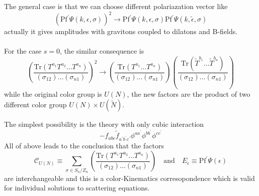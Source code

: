 \documentclass{beamer}
\begin{document}
\begin{frame}
    The general case is that we can choose different polariazation vector like 
    \begin{equation*}
        \left(\mathrm{Pf}^\prime \Psi(k,\epsilon,\sigma)\right)^2\to\mathrm{Pf}^\prime \Psi(k,\epsilon,\sigma)\mathrm{Pf}^\prime \Psi(k,\tilde{\epsilon},\sigma)
    \end{equation*}
    actually it gives amplitudes with gravitons coupled to dilatons and B-fields.
    \\ \hspace*{\fill}\\
    For the case $s=0$, the similar consequence is 
    \begin{equation*}
        \left(\frac{\mathrm{Tr}(T^{a_1}T^{a_2}\dots T^{a_n})}{(\sigma_{12})\dots (\sigma_{n1})}\right)^2\to\left(\frac{\mathrm{Tr}(T^{a_1}\dots T^{a_n})}{(\sigma_{12})\dots (\sigma_{n1})}\right)
        \left(\frac{\mathrm{Tr}(\tilde{T}^{b_1}\dots \tilde{T}^{b_n})}{(\sigma_{12})\dots (\sigma_{n1})}\right)
    \end{equation*}
    while the original color group is $U(N)$, the new factors are the product of two different color group \alert{$U(N)\times U(\tilde{N})$}.
\end{frame}
\begin{frame}
    The simplest possibility is the theory with only cubic interaction
    \begin{equation*}
        -f_{abc}\tilde{f}_{a^\prime b^\prime c^\prime}\phi^{aa^\prime}\phi^{bb^\prime}\phi^{cc^\prime}
    \end{equation*}
    All of above leads to the conclusion that the factors 
    \begin{equation*}
        \mathcal{C}_{U(N)}\equiv \sum_{\sigma\in S_n/Z_n}\left(\frac{\mathrm{Tr}(T^{a_1}T^{a_2}\dots T^{a_n})}{(\sigma_{12})\dots (\sigma_{n1})}\right)\quad \mathrm{and} \quad E_\epsilon\equiv\mathrm{Pf}^{'}\Psi(\epsilon)
    \end{equation*}
    are interchangeable and this is a color-Kinematics corresopondence which is valid for individual solutions to scattering equations.
   
\end{frame}
\end{document}
